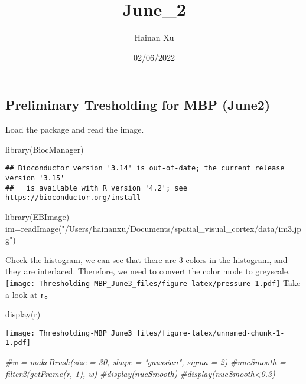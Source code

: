 \documentclass[
]{article}
\title{June\_2}
\author{Hainan Xu}
\date{02/06/2022}
\newenvironment{Shaded}{\begin{snugshade}}{\end{snugshade}}
\newcommand{\CommentTok}[1]{\textcolor[rgb]{0.56,0.35,0.01}{\textit{#1}}}
\newcommand{\FunctionTok}[1]{\textcolor[rgb]{0.00,0.00,0.00}{#1}}
\newcommand{\NormalTok}[1]{#1}
\newcommand{\OtherTok}[1]{\textcolor[rgb]{0.56,0.35,0.01}{#1}}
\newcommand{\StringTok}[1]{\textcolor[rgb]{0.31,0.60,0.02}{#1}}
\begin{document}
\maketitle

\hypertarget{preliminary-tresholding-for-mbp-june2}{%
\subsection{Preliminary Tresholding for MBP
(June2)}\label{preliminary-tresholding-for-mbp-june2}}

Load the package and read the image.

\begin{Shaded}
\begin{Highlighting}[]
\FunctionTok{library}\NormalTok{(BiocManager)}
\end{Highlighting}
\end{Shaded}

\begin{verbatim}
## Bioconductor version '3.14' is out-of-date; the current release version '3.15'
##   is available with R version '4.2'; see https://bioconductor.org/install
\end{verbatim}

\begin{Shaded}
\begin{Highlighting}[]
\FunctionTok{library}\NormalTok{(EBImage)}
\NormalTok{im}\OtherTok{=}\FunctionTok{readImage}\NormalTok{(}\StringTok{"/Users/hainanxu/Documents/spatial\_visual\_cortex/data/im3.jpg"}\NormalTok{)}
\end{Highlighting}
\end{Shaded}

Check the histogram, we can see that there are 3 colors in the
histogram, and they are interlaced. Therefore, we need to convert the
color mode to greyscale.
\texttt{[image: Thresholding-MBP\_June3\_files/figure-latex/pressure-1.pdf]}
Take a look at \texttt{r}。

\begin{Shaded}
\begin{Highlighting}[]
\FunctionTok{display}\NormalTok{(r)}
\end{Highlighting}
\end{Shaded}

\texttt{[image: Thresholding-MBP\_June3\_files/figure-latex/unnamed-chunk-1-1.pdf]}

\begin{Shaded}
\begin{Highlighting}[]
\CommentTok{\#w = makeBrush(size = 30, shape = "gaussian", sigma = 2)}
\CommentTok{\#nucSmooth = filter2(getFrame(r, 1), w)}
\CommentTok{\#display(nucSmooth)}
\CommentTok{\#display(nucSmooth\textless{}0.3)}
\end{Highlighting}
\end{Shaded}
\end{document}
